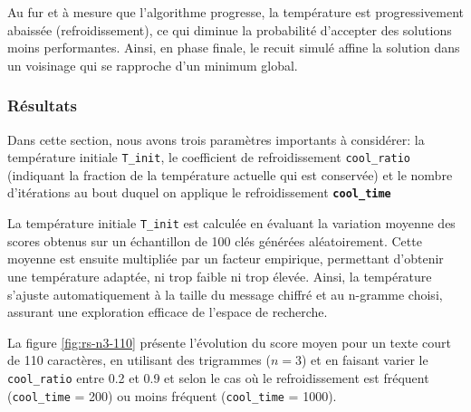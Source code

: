 \documentclass[a4paper]{article}
\begin{document}
Au fur et à mesure que l'algorithme progresse, la température est progressivement abaissée (refroidissement), ce qui diminue la probabilité d'accepter des solutions moins performantes. Ainsi, en phase finale, le recuit simulé affine la solution dans un voisinage qui se rapproche d'un minimum global.


\subsubsection{Résultats}

Dans cette section, nous avons trois paramètres importants à considérer: la température initiale \texttt{T\_init}, le coefficient de refroidissement \texttt{cool\_ratio} (indiquant la fraction de la température actuelle qui est conservée) et le nombre d'itérations au bout duquel on applique le refroidissement \textbf{\texttt{cool\_time}}

La température initiale \texttt{T\_init} est calculée en évaluant la variation moyenne des scores obtenus sur un échantillon de 100 clés générées aléatoirement. Cette moyenne est ensuite multipliée par un facteur empirique, permettant d'obtenir une température adaptée, ni trop faible ni trop élevée. 
Ainsi, la température s'ajuste automatiquement à la taille du message chiffré et au n-gramme choisi, assurant une exploration efficace de l'espace de recherche.


La figure \ref{fig:rs-n3-110} présente l'évolution du score moyen pour un texte court de 110 caractères, en utilisant des trigrammes ($n=3$) et en faisant varier le \texttt{cool\_ratio} entre 0.2 et 0.9 et selon le cas où le refroidissement est fréquent (\texttt{cool\_time} = 200) ou moins fréquent (\texttt{cool\_time} = 1000).
\end{document}
